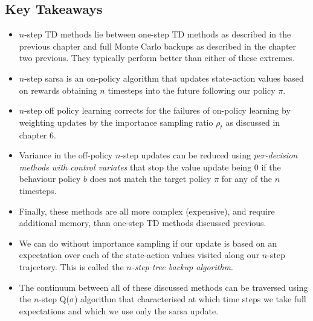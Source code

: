 \subsection{Key Takeaways}
\begin{itemize}
\item $n$-step TD methods lie between one-step TD methods as described in the previous chapter and full Monte Carlo backups as described in the chapter two previous. They typically perform better than either of these extremes.
\item $n$-step sarsa is an on-policy algorithm that updates state-action values based on rewards obtaining $n$ timesteps into the future following our policy $\pi$.
\item $n$-step off policy learning corrects for the failures of on-policy learning by weighting updates by the importance sampling ratio $\rho_t$ as discussed in chapter 6.
\item Variance in the off-policy $n$-step updates can be reduced using \textit{per-decision methods with control variates} that stop the value update being 0 if the behaviour policy $b$ does not match the target policy $\pi$ for any of the $n$ timesteps.
\item Finally, these methods are all more complex (expensive), and require additional memory, than one-step TD methods discussed previous.
\item We can do without importance sampling if our update is based on an expectation over each of the state-action values visited along our $n$-step trajectory. This is called the \textit{$n$-step tree backup algorithm}.
\item The continuum between all of these discussed methods can be traversed using the $n$-step Q($\sigma$) algorithm that characterised at which time steps we take full expectations and which we use only the sarsa update.
\end{itemize}